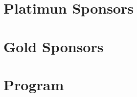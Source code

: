 \documentclass[12pt]{article}
\begin{document}


\newpage

\vspace*{1cm}

\newpage



\newpage

\section*{Platimun Sponsors}
\begin{minipage}{0.4\textwidth}

\end{minipage}
\hfill
\begin{minipage}{0.4\textwidth}

\end{minipage}

\newpage

\section*{Gold Sponsors}
\begin{minipage}{0.4\textwidth}

\end{minipage}
\hfill
\begin{minipage}{0.4\textwidth}

\end{minipage}

\vspace*{1cm}

\begin{minipage}{0.4\textwidth}

\end{minipage}
\hfill
\begin{minipage}{0.4\textwidth}

\end{minipage}

\newpage

\section*{Program}


\newpage



\newpage

\vspace*{1cm}
\end{document}
